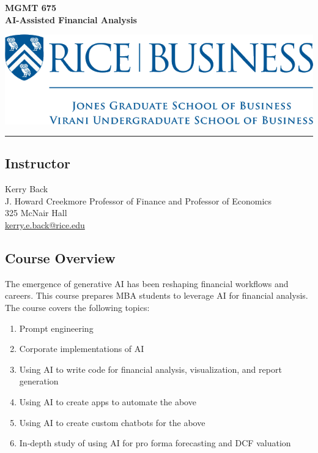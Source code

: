 \documentclass[11pt]{article}
\begin{document}
\begin{minipage}[c][3cm][c]{0.5\textwidth}
\Large\textbf{MGMT 675\\ AI-Assisted Financial Analysis}
\end{minipage}
\hfill
\begin{minipage}[c][3cm][c]{0.4\textwidth}
\includegraphics[width=\textwidth]{images/rice-business-transparent-final.png}
\end{minipage}

\vspace{0.5cm}
\hrule

\subsection*{Instructor}
Kerry Back\\
J. Howard Creekmore Professor of Finance and Professor of Economics\\
325 McNair Hall\\
\href{mailto:kerry.e.back@rice.edu}{kerry.e.back@rice.edu}

\subsection*{Course Overview}

The emergence of generative AI has been reshaping financial workflows and careers. This course prepares MBA students to leverage AI for financial analysis.  The course covers the following topics:

\begin{enumerate}\setlength{\itemsep}{0pt}
\item Prompt engineering
\item Corporate implementations of AI
\item Using AI to write code for financial analysis, visualization, and report generation
\item Using AI to create apps to automate the above
\item Using AI to create custom chatbots for the above 
\item In-depth study of using AI for pro forma forecasting and DCF valuation
\end{enumerate}
\end{document}
